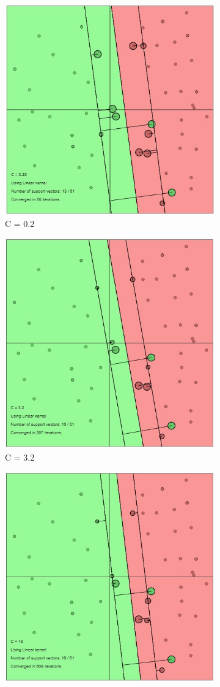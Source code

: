 \documentclass[12pt]{report}
\begin{document}
{\begin{figure}[!ht] 
	\centering
	\begin{subfigure}{.32\textwidth}
		\centering
		\includegraphics[width=.65\linewidth]{lin_C(0.2).jpg}
		\caption{C = 0.2}
		\label{fig:C0.2}
	\end{subfigure}%
	\begin{subfigure}{.32\textwidth}
		\centering
		\includegraphics[width=.65\linewidth]{lin_C(3.2).jpg}
		\caption{C = 3.2}
		\label{fig:C3.2}
	\end{subfigure}
	\begin{subfigure}{.32\textwidth}
		\centering
		\includegraphics[width=.65\linewidth]{lin_C(16).jpg}

\end{subfigure}
\end{figure}}
\end{document}
